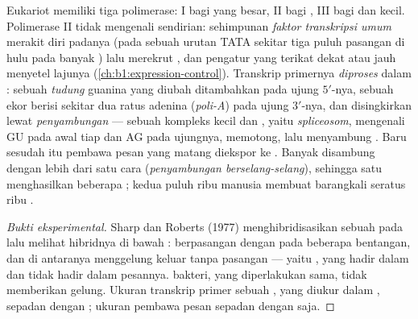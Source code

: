 \begin{proposition}\label{prop:b1:gene-expression:processing}
Eukariot memiliki tiga polimerase: I bagi  yang besar, II
bagi , III bagi  dan  kecil. Polimerase
II tidak mengenali  sendirian: sehimpunan \emph{faktor
transkripsi umum} merakit diri padanya (pada sebuah urutan TATA sekitar
tiga puluh pasangan di hulu pada banyak ) lalu merekrut ,
dan  pengatur yang terikat dekat atau jauh menyetel lajunya
(\cref{ch:b1:expression-control}). Transkrip primernya
\emph{diproses} dalam : sebuah \emph{tudung} guanina yang diubah
ditambahkan pada ujung $5'$-nya, sebuah ekor berisi sekitar dua ratus
adenina (\emph{poli-A}) pada ujung $3'$-nya, dan  disingkirkan
lewat \emph{penyambungan} --- sebuah kompleks  kecil dan ,
yaitu \emph{spliceosom}, mengenali GU pada awal tiap  dan AG
pada ujungnya, memotong, lalu menyambung . Baru sesudah itu
pembawa pesan yang matang diekspor ke . Banyak  disambung
dengan lebih dari satu cara (\emph{penyambungan berselang-selang}),
sehingga satu  menghasilkan beberapa ; kedua puluh ribu 
manusia membuat barangkali seratus ribu .
\end{proposition}
\begin{proof}[Bukti eksperimental]
Sharp dan Roberts (1977) menghibridisasikan sebuah 
 pada   lalu melihat hibridnya di bawah :  berpasangan dengan  pada beberapa bentangan,
dan di antaranya  menggelung keluar tanpa pasangan --- yaitu
, yang hadir dalam  dan tidak hadir dalam pesannya. 
bakteri, yang diperlakukan sama, tidak memberikan gelung. Ukuran
transkrip primer sebuah , yang diukur dalam , sepadan dengan
; ukuran pembawa pesan  sepadan dengan  saja.
\end{proof}

